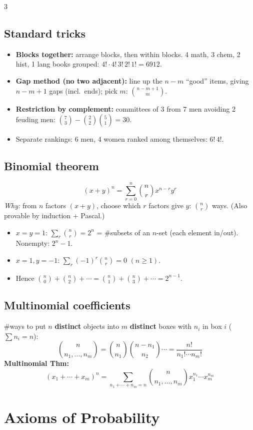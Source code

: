 \documentclass[8pt]{extarticle}
\begin{document}
\begin{multicols*}{3}
\subsection{Standard tricks}
\begin{itemize}
\item \textbf{Blocks together:} arrange blocks, then within blocks. 4 math, 3 chem, 2 hist, 1 lang books grouped: $4!\cdot4!\,3!\,2!\,1!=6912$.
\item \textbf{Gap method (no two adjacent):} line up the $n-m$ ``good'' items, giving $n-m+1$ gaps (incl.\ ends); pick $m$: $\binom{n-m+1}{m}$.
\item \textbf{Restriction by complement:} committees of 3 from 7 men avoiding 2 feuding men: $\binom73-\binom22\binom51=30$.
\item Separate rankings: $6$ men, $4$ women ranked among themselves: $6!\,4!$.
\end{itemize}

\subsection{Binomial theorem}
\[(x+y)^n=\sum_{r=0}^n\binom nr x^{n-r}y^r\]
\emph{Why:} from $n$ factors $(x+y)$, choose which $r$ factors give $y$: $\binom nr$ ways. (Also provable by induction + Pascal.)
\begin{itemize}
\item $x=y=1$: $\sum_r\binom nr=2^n$ = \#subsets of an $n$-set (each element in/out). Nonempty: $2^n-1$.
\item $x=1,y=-1$: $\sum_r(-1)^r\binom nr=0$ $(n\ge1)$.
\item Hence $\binom n0+\binom n2+\cdots=\binom n1+\binom n3+\cdots=2^{n-1}$.
\end{itemize}

\subsection{Multinomial coefficients}
\#ways to put $n$ \textbf{distinct} objects into $m$ \textbf{distinct} boxes with $n_i$ in box $i$ ($\sum n_i=n$):
\[\binom{n}{n_1,\dots,n_m}=\binom n{n_1}\binom{n-n_1}{n_2}\cdots=\frac{n!}{n_1!\cdots n_m!}\]
\textbf{Multinomial Thm:}\[(x_1+\cdots+x_m)^n=\sum_{n_1+\cdots+n_m=n}\binom{n}{n_1,\dots,n_m}x_1^{n_1}\cdots x_m^{n_m}\]

\section{Axioms of Probability}

\end{multicols*}
\end{document}
